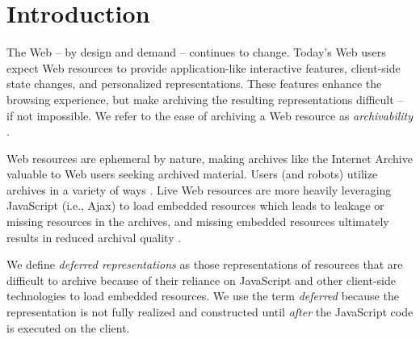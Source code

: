 \documentclass{ipres_proc_article-sp}
\begin{document}


\section{Introduction}
\label{introduction}
The Web -- by design and demand -- continues to change. Today's Web users expect Web resources to provide application-like interactive features, client-side state changes, and personalized representations. These features enhance the browsing experience, but make archiving the resulting representations difficult -- if not impossible. We refer to the ease of archiving a Web resource as \emph{archivability} \cite{ijdl}. 


Web resources are ephemeral by nature, making archives like the Internet Archive \cite{iawebarchive, waybackarchives2} valuable to Web users seeking archived material. Users (and robots) utilize archives in a variety of ways \cite{usingIA, marshalls_social_media_study, yasminLinks}. Live Web resources are more heavily leveraging JavaScript (i.e., Ajax) to load embedded resources which leads to leakage \cite{zombies} or missing resources in the archives, and missing embedded resources ultimately results in reduced archival quality \cite{brunelleDamage}.

We define \emph{deferred representations} as those representations of resources that are difficult to archive because of their reliance on JavaScript and other client-side technologies to load embedded resources. We use the term \emph{deferred} because the representation is not fully realized and constructed until \emph{after} the JavaScript code is executed on the client. 
\end{document}
